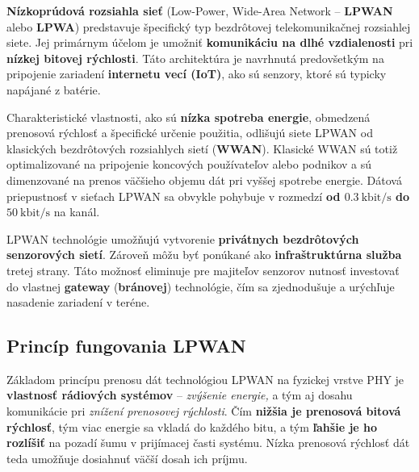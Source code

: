 \documentclass[11pt]{article}
\begin{document}
\noindent
\textbf{Nízkoprúdová rozsiahla sieť} (Low-Power, Wide-Area Network – \textbf{LPWAN} alebo \textbf{LPWA}) predstavuje špecifický typ bezdrôtovej telekomunikačnej rozsiahlej siete. Jej primárnym účelom je umožniť \textbf{komunikáciu na dlhé vzdialenosti} pri \textbf{nízkej bitovej rýchlosti}. Táto architektúra je navrhnutá predovšetkým na pripojenie zariadení \textbf{internetu vecí (IoT)}, ako sú senzory, ktoré sú typicky napájané z batérie.

\vspace{0.5\baselineskip} %

\noindent
Charakteristické vlastnosti, ako sú \textbf{nízka spotreba energie}, obmedzená prenosová rýchlosť a špecifické určenie použitia, odlišujú siete LPWAN od klasických bezdrôtových rozsiahlych sietí (\textbf{WWAN}). Klasické WWAN sú totiž optimalizované na pripojenie koncových používateľov alebo podnikov a sú dimenzované na prenos väčšieho objemu dát pri vyššej spotrebe energie. Dátová priepustnosť v sieťach LPWAN sa obvykle pohybuje v rozmedzí \textbf{od $0.3\ \text{kbit/s}$ do $50\ \text{kbit/s}$} na kanál.

\vspace{0.5\baselineskip}

\noindent
LPWAN technológie umožňujú vytvorenie \textbf{privátnych bezdrôtových senzorových sietí}. Zároveň môžu byť ponúkané ako \textbf{infraštruktúrna služba} tretej strany. Táto možnosť eliminuje pre majiteľov senzorov nutnosť investovať do vlastnej \textbf{gateway} (\textbf{bránovej}) technológie, čím sa zjednodušuje a urýchľuje nasadenie zariadení v teréne.

\subsection*{\bf Princíp fungovania LPWAN}

\noindent
Základom princípu prenosu dát technológiou LPWAN na fyzickej vrstve PHY je \textbf{vlastnosť rádiových systémov} – \textit{zvýšenie energie,} a tým aj dosahu komunikácie pri \textit{znížení prenosovej rýchlosti}. Čím \textbf{nižšia je prenosová bitová rýchlosť}, tým viac energie sa vkladá do každého bitu, a tým \textbf{ľahšie je ho rozlíšiť} na pozadí šumu v prijímacej časti systému. Nízka prenosová rýchlosť dát teda umožňuje dosiahnuť väčší dosah ich príjmu.

\vspace{0.5\baselineskip}

\noindent
\end{document}
